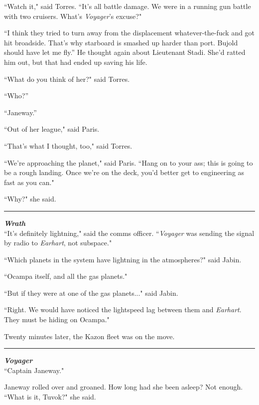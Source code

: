 \documentclass[twoside,letterpaper,12pt]{memoir}
\begin{document}
``Watch it," said Torres. ``It’s all battle damage. We were in a running gun battle with two cruisers. What's \textit{Voyager}'s excuse?"

``I think they tried to turn away from the displacement whatever-the-fuck and got hit broadside. That’s why starboard is smashed up harder than port. Bujold should have let me fly.” He thought again about Lieutenant Stadi. She’d ratted him out, but that had ended up saving his life.

``What do you think of her?" said Torres.

``Who?”

``Janeway.”

``Out of her league," said Paris.

``That's what I thought, too," said Torres.

``We're approaching the planet," said Paris. ``Hang on to your ass; this is going to be a rough landing. Once we're on the deck, you'd better get to engineering as fast as you can."

``Why?" she said.

\begin{center}\rule{3cm}{0.4 pt}\end{center}

\noindent\textit{\textbf{Wrath}}\\

``It's definitely lightning," said the comms officer. ``\textit{Voyager} was sending the signal by radio to \textit{Earhart}, not subspace."

``Which planets in the system have lightning in the atmospheres?" said Jabin.

``Ocampa itself, and all the gas planets."

``But if they were at one of the gas planets..." said Jabin.

``Right. We would have noticed the lightspeed lag between them and \textit{Earhart}. They must be hiding on Ocampa."

Twenty minutes later, the Kazon fleet was on the move.

\begin{center}\rule{3cm}{0.4 pt}\end{center}

\noindent\textit{\textbf{Voyager}}\\

``Captain Janeway."

Janeway rolled over and groaned. How long had she been asleep? Not enough. ``What is it, Tuvok?" she said.
\end{document}
